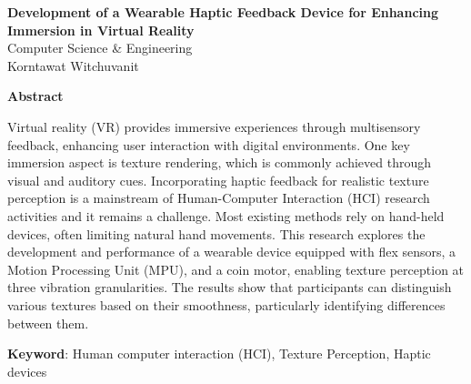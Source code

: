 \documentclass[uplatex,
12pt, %
a4paper,
english, %
oneside,
titlepage,
singlespacing, %
liststotoc, %
headsepline,
]{MastersDoctoralThesis} %
\begin{document}

\thispagestyle{empty}
\begin{center}
    \vspace*{1cm} %

    {\Large \textbf{Development of a Wearable Haptic Feedback Device for Enhancing Immersion in Virtual Reality}} \\ %
    \vspace{1.5cm} %
    {Computer Science \& Engineering} \\ %
    {Korntawat Witchuvanit} \\ %

    \vspace*{2cm} %
\end{center}

\begin{center}
    \textbf{Abstract} %
\end{center}
\vspace{0.5cm} %

Virtual reality (VR) provides immersive experiences through multisensory feedback, enhancing user interaction with digital environments. One key immersion aspect is texture rendering, which is commonly achieved through visual and auditory cues. Incorporating haptic feedback for realistic texture perception is a mainstream of Human-Computer Interaction (HCI) research activities and it remains a challenge. Most existing methods rely on hand-held devices, often limiting natural hand movements. This research explores the development and performance of a wearable device equipped with flex sensors, a Motion Processing Unit (MPU), and a coin motor, enabling texture perception at three vibration granularities. The results show that participants can distinguish various textures based on their smoothness, particularly identifying differences between them.

\vspace{5mm} %

\textbf{Keyword}: Human computer interaction (HCI), Texture Perception, Haptic devices
\end{document}
